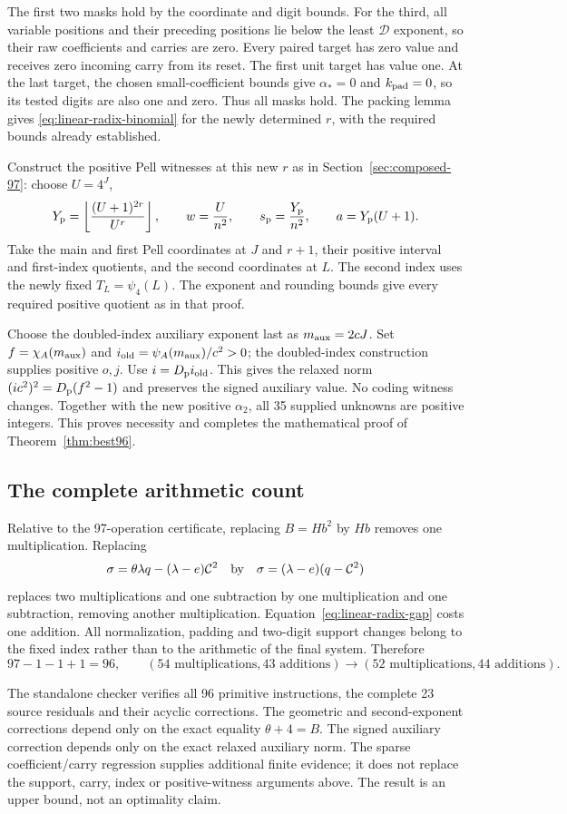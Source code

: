 The first two masks hold by the coordinate and digit bounds.
For the third, all variable positions and their preceding
positions lie below the least $\mathcal D$ exponent, so their
raw coefficients and carries are zero. Every paired target has
zero value and receives zero incoming carry from its reset.
The first unit target has value one. At the last target, the
chosen small-coefficient bounds give $\alpha_*=0$ and
$k_{\rm pad}=0$, so its tested digits are also one and zero.
Thus all masks hold. The packing lemma gives
\eqref{eq:linear-radix-binomial} for the newly determined $r$,
with the required bounds already established.

Construct the positive Pell witnesses at this new $r$ as in
Section~\ref{sec:composed-97}: choose $U=4^J$,
\[
 Y_{\rm p}=\left\lfloor\frac{(U+1)^{2r}}{U^r}\right\rfloor,
 \qquad w=\frac U{n^2},\qquad
 s_{\rm p}=\frac{Y_{\rm p}}{n^2},\qquad a=Y_{\rm p}(U+1).
\]
Take the main and first Pell coordinates at $J$ and $r+1$,
their positive interval and first-index quotients, and the
second coordinates at $L$. The second index uses the newly
fixed $T_L=\psi_4(L)$. The exponent and rounding bounds give
every required positive quotient as in that proof.

Choose the doubled-index auxiliary exponent last as
$m_{\rm aux}=2cJ$. Set $f=\chi_A(m_{\rm aux})$ and
$i_{\rm old}=\psi_A(m_{\rm aux})/c^2>0$; the doubled-index
construction supplies positive $o,j$. Use
$i=D_{\rm p}i_{\rm old}$. This gives the relaxed norm
$(ic^2)^2=D_{\rm p}(f^2-1)$ and preserves the signed auxiliary
value. No coding witness changes. Together with the new positive
$\alpha_2$, all 35 supplied unknowns are positive integers.
This proves necessity and completes the mathematical proof of
Theorem~\ref{thm:best96}.

\subsection{The complete arithmetic count}

Relative to the 97-operation certificate, replacing $B=Hb^2$
by $Hb$ removes one multiplication. Replacing
\[
 \sigma=\theta\lambda q-(\lambda-e)\mathcal C^2
 \quad\hbox{by}\quad
 \sigma=(\lambda-e)(q-\mathcal C^2)
\]
replaces two multiplications and one subtraction by one
multiplication and one subtraction, removing another
multiplication. Equation~\eqref{eq:linear-radix-gap} costs
one addition. All normalization, padding and two-digit support
changes belong to the fixed index rather than to the arithmetic
of the final system. Therefore
\[
 97-1-1+1=96,\qquad
 (54\text{ multiplications},43\text{ additions})
 \longrightarrow(52\text{ multiplications},44\text{ additions}).
\]

The standalone checker verifies all 96 primitive instructions,
the complete 23 source residuals and their acyclic corrections.
The geometric and second-exponent corrections depend only on
the exact equality $\theta+4=B$. The signed auxiliary
correction depends only on the exact relaxed auxiliary norm.
The sparse coefficient/carry regression supplies additional
finite evidence; it does not replace the support, carry, index
or positive-witness arguments above. The result is an upper
bound, not an optimality claim.
